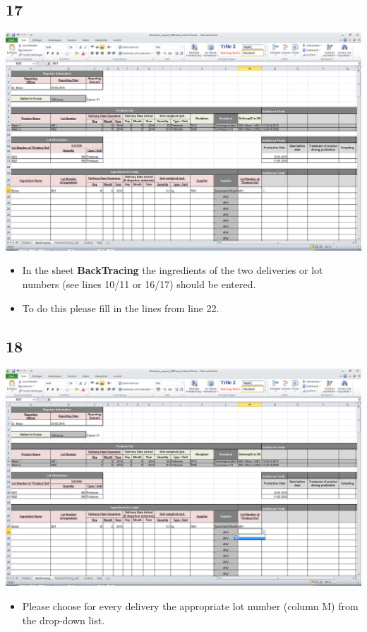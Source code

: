 \documentclass{beamer}
\begin{document}
\subsection{17}
\begin{frame}
	\begin{center}
  		\includegraphics[height=0.6\textheight]{17.png}
	\end{center}
	\begin{itemize}
		\item In the sheet \textbf{BackTracing} the ingredients of the two deliveries or lot numbers (see lines 10/11 or 16/17) should be entered.
		\item To do this please fill in the lines from line 22.
	\end{itemize}
\end{frame}

\subsection{18}
\begin{frame}
	\begin{center}
  		\includegraphics[height=0.6\textheight]{18.png}
	\end{center}
	\begin{itemize}
		\item Please choose for every delivery the appropriate lot number (column M) from the drop-down list.
	\end{itemize}
\end{frame}
\end{document}

